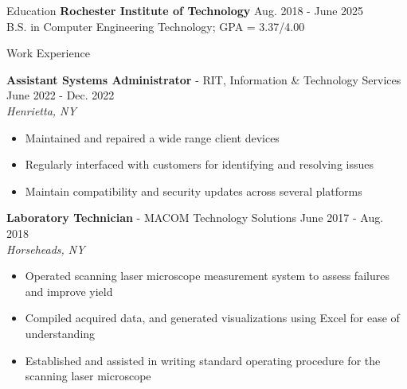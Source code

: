 \documentclass[UTF-8]{resume} \usepackage{multirow}
\begin{document}
\begin{rSection}{Education}
	{\bf Rochester Institute of Technology}  \hfill {Aug. 2018 - June 2025}\\
	B.S. in Computer Engineering Technology; GPA = 3.37/4.00
\end{rSection}


\begin{rSection}{Work Experience}
	\vspace{-1.6em}
    \item \textbf{Assistant Systems Administrator} {- RIT, Information \& Technology Services} \hfill {June 2022 - Dec. 2022}\\
	\emph{Henrietta, NY}
	\begin{itemize}
		\itemsep -6pt {}
		\item Maintained and repaired a wide range client devices
		\item Regularly interfaced with customers for identifying and resolving issues
		\item Maintain compatibility and security updates across several platforms
	\end{itemize}
	\item \textbf{Laboratory Technician} {- MACOM Technology Solutions} \hfill {June 2017 - Aug. 2018}\\
	\emph{Horseheads, NY}
	\begin{itemize}
		\itemsep -6pt {}
		\item Operated scanning laser microscope measurement system to assess failures and improve yield
		\item Compiled acquired data, and generated visualizations using Excel for ease of understanding
		\item Established and assisted in writing standard operating procedure for the scanning laser microscope
	\end{itemize}
\end{rSection}
\end{document}

